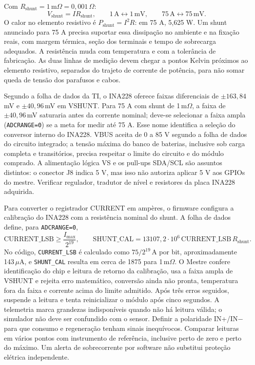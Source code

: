 Com $R_{\mathrm{shunt}}=1\,\mathrm{m}\Omega=0{,}001\,\Omega$:
\begin{equation}
V_{\mathrm{shunt}}=IR_{\mathrm{shunt}},\qquad
1\,\mathrm{A}\longleftrightarrow 1\,\mathrm{mV},\qquad
75\,\mathrm{A}\longleftrightarrow 75\,\mathrm{mV}.
\label{eq:shunt}
\end{equation}
O calor no elemento resistivo é $P_{\mathrm{shunt}}=I^2R$: em 75 A, 5,625 W. Um shunt anunciado para 75 A precisa suportar essa dissipação no ambiente e na fixação reais, com margem térmica, seção dos terminais e tempo de sobrecarga adequados. A resistência muda com temperatura e com a tolerância de fabricação. As duas linhas de medição devem chegar a pontos Kelvin próximos ao elemento resistivo, separados do trajeto de corrente de potência, para não somar queda de tensão dos parafusos e cabos.

Segundo a folha de dados da TI, o INA228 oferece faixas diferenciais de $\pm163{,}84$\,mV e $\pm40{,}96$\,mV em VSHUNT. Para 75 A com shunt de 1\,m$\Omega$, a faixa de $\pm40{,}96$\,mV saturaria antes da corrente nominal; deve-se selecionar a faixa ampla (\texttt{ADCRANGE=0}) se a meta for medir até 75 A. Esse nome identifica a seleção do conversor interno do INA228. VBUS aceita de 0 a 85 V segundo a folha de dados do circuito integrado; a tensão máxima do banco de baterias, inclusive sob carga completa e transitórios, precisa respeitar o limite do circuito e do módulo comprado. A alimentação lógica VS e os pull-ups SDA/SCL são assuntos distintos: o conector J8 indica 5 V, mas isso não autoriza aplicar 5 V aos GPIOs do mestre. Verificar regulador, tradutor de nível e resistores da placa INA228 adquirida.

Para converter o registrador CURRENT em ampères, o firmware configura a calibração do INA228 com a resistência nominal do shunt. A folha de dados define, para \texttt{ADCRANGE=0},
\begin{equation}
\mathrm{CURRENT\_LSB}\geq \frac{I_{\max}}{2^{19}},
\qquad
\mathrm{SHUNT\_CAL}=13107{,}2\cdot10^6\,
       \mathrm{CURRENT\_LSB}\,R_{\mathrm{shunt}} .
\label{eq:ina-cal}
\end{equation}
No código, \texttt{CURRENT\_LSB} é calculado como $75/2^{19}$\,A por bit, aproximadamente 143\,$\mu$A, e \texttt{SHUNT\_CAL} resulta em cerca de 1875 para 1\,m$\Omega$. O Mestre confere identificação do chip e leitura de retorno da calibração, usa a faixa ampla de VSHUNT e rejeita erro matemático, conversão ainda não pronta, temperatura fora da faixa e corrente acima do limite admitido. Após três erros seguidos, suspende a leitura e tenta reinicializar o módulo após cinco segundos. A telemetria marca grandezas indisponíveis quando não há leitura válida; o simulador não deve ser confundido com o sensor. Definir a polaridade IN+/IN$-$ para que consumo e regeneração tenham sinais inequívocos. Comparar leituras em vários pontos com instrumento de referência, inclusive perto de zero e perto do máximo. Um alerta de sobrecorrente por software não substitui proteção elétrica independente.

